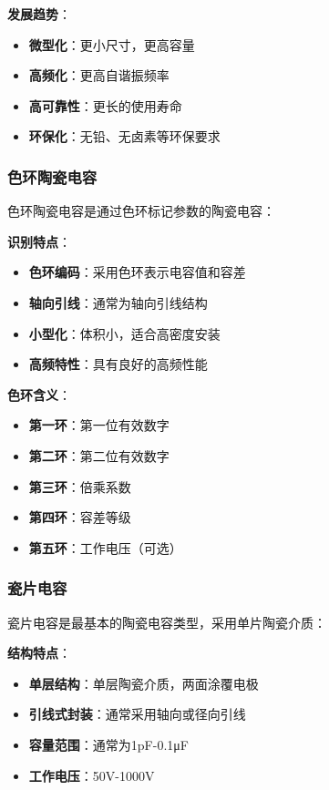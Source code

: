 \documentclass[12pt,UTF8]{ctexbook}
\begin{document}
\textbf{发展趋势}：
\begin{itemize}[leftmargin=3.5em]
    \item \textbf{微型化}：更小尺寸，更高容量
    \item \textbf{高频化}：更高自谐振频率
    \item \textbf{高可靠性}：更长的使用寿命
    \item \textbf{环保化}：无铅、无卤素等环保要求
\end{itemize}

\subsubsection{色环陶瓷电容}

色环陶瓷电容是通过色环标记参数的陶瓷电容：

\textbf{识别特点}：
\begin{itemize}[leftmargin=3.5em]
	\item \textbf{色环编码}：采用色环表示电容值和容差
	\item \textbf{轴向引线}：通常为轴向引线结构
	\item \textbf{小型化}：体积小，适合高密度安装
	\item \textbf{高频特性}：具有良好的高频性能
\end{itemize}

\textbf{色环含义}：
\begin{itemize}[leftmargin=3.5em]
	\item \textbf{第一环}：第一位有效数字
	\item \textbf{第二环}：第二位有效数字
	\item \textbf{第三环}：倍乘系数
	\item \textbf{第四环}：容差等级
	\item \textbf{第五环}：工作电压（可选）
\end{itemize}

\subsubsection{瓷片电容}

瓷片电容是最基本的陶瓷电容类型，采用单片陶瓷介质：

\textbf{结构特点}：
\begin{itemize}[leftmargin=3.5em]
	\item \textbf{单层结构}：单层陶瓷介质，两面涂覆电极
	\item \textbf{引线式封装}：通常采用轴向或径向引线
	\item \textbf{容量范围}：通常为1pF-0.1μF
	\item \textbf{工作电压}：50V-1000V
\end{itemize}
\end{document}
